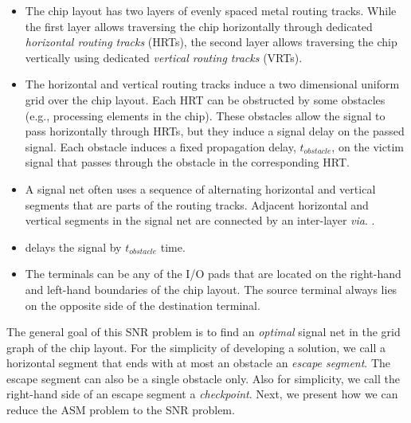 \begin{itemize}

\item The chip layout has two layers of evenly spaced metal routing tracks. While the first layer allows traversing the chip horizontally through dedicated \emph{horizontal routing tracks} (HRTs), the second layer allows traversing the chip vertically using dedicated \emph{vertical routing tracks} (VRTs).

\item The horizontal and vertical routing tracks induce a two dimensional uniform grid over the chip layout. Each HRT can be obstructed by some obstacles (e.g., processing elements in the chip).  These obstacles allow the signal to pass horizontally through HRTs, but they induce a signal delay on the passed signal. Each obstacle induces a fixed propagation delay, $t_{obstacle}$, on the victim signal that passes through the obstacle in the corresponding HRT.
\item A signal net often uses a sequence of alternating horizontal and vertical segments that are parts of the routing tracks. Adjacent horizontal and vertical segments in the signal net are connected by an inter-layer \emph{via}. .
\item {} delays the signal by $t_{obstacle}$ time.
\item The terminals can be any of the I/O pads that are located on the right-hand and left-hand boundaries of the chip layout. The source terminal always lies on the opposite side of the destination terminal.
\end{itemize}

The general goal of this SNR problem is to find an \emph{optimal} signal net in the grid graph of the chip layout. 
For the simplicity of developing a solution, we call a horizontal segment that ends with at most an obstacle an \emph{escape segment}. 
The escape segment can also be a single obstacle only. Also for simplicity, we call the right-hand side of an escape segment {a} \emph{checkpoint}. 
Next, we present how we can reduce the ASM problem to the SNR problem.

